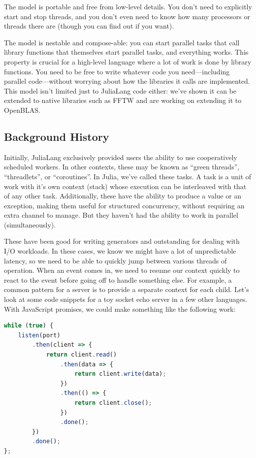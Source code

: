 \documentclass{juliacon}
\begin{document}
The model is portable and free from low-level details. You don’t need to explicitly start and stop threads, and you don’t even need to know how many processors or threads there are (though you can find out if you want).

The model is nestable and compose-able: you can start parallel tasks that call library functions that themselves start parallel tasks, and everything works. This property is crucial for a high-level language where a lot of work is done by library functions. You need to be free to write whatever code you need—including parallel code—without worrying about how the libraries it calls are implemented. This model isn't limited just to JuliaLang code either: we've shown it can be extended to native libraries such as FFTW and are working on extending it to OpenBLAS.


\subsection{Background History}
\label{subsub:background}

Initially, JuliaLang exclusively provided users the ability to use cooperatively scheduled workers. In other contexts, these may be known as ``green threads'', ``threadlets'', or ``coroutines''. In Julia, we've called these tasks. A task is a unit of work with it's own context (stack) whose execution can be interleaved with that of any other task. Additionally, these have the ability to produce a value or an exception, making them useful for structured concurrency, without requiring an extra channel to manage. But they haven't had the ability to work in parallel (simultaneously).

These have been good for writing generators and outstanding for dealing with I/O workloads. In these cases, we know we might have a lot of unpredictable latency, so we need to be able to quickly jump between various threads of operation. When an event comes in, we need to resume our context quickly to react to the event before going off to handle something else. For example, a common pattern for a server is to provide a separate context for each child. Let's look at some code snippets for a toy socket echo server in a few other languages. With JavaScript promises, we could make something like the following work:

\begin{lstlisting}[language = JavaScript]
while (true) {
    listen(port)
        .then(client => {
            return client.read()
                .then(data => {
                    return client.write(data);
                })
                .then(() => {
                    return client.close();
                })
                .done();
        })
        .done();
};
\end{lstlisting}
\end{document}
